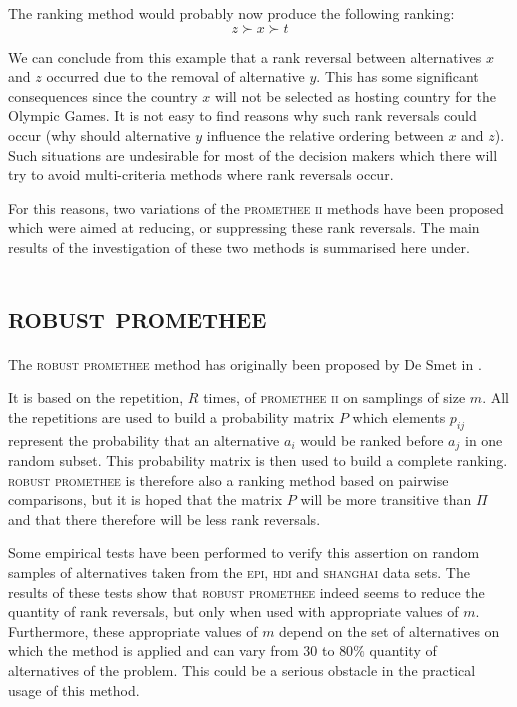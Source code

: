 \documentclass[conference,compsoc]{IEEEtran}
\begin{document}
The ranking method would probably now produce the following ranking:
\begin{equation}
  z \succ x \succ t
  \label{eq:ranking_3alt_t}
\end{equation}

We can conclude from this example that a rank reversal between alternatives $x$ and $z$ occurred due to the removal of alternative $y$. This has some significant consequences since the country $x$ will not be selected as hosting country for the Olympic Games. It is not easy to find reasons why such rank reversals could occur (why should alternative $y$ influence the relative ordering between $x$ and $z$). Such situations are undesirable for most of the decision makers which there will try to avoid multi-criteria methods where rank reversals occur.

For this reasons, two variations of the \textsc{promethee ii} methods have been proposed which were aimed at reducing, or suppressing these rank reversals. The main results of the investigation of these two methods is summarised here under.

\section{\textsc{robust promethee}}


The \textsc{robust promethee} method has originally been proposed by De Smet in \cite{RobPII}. 

It is based on the repetition, $R$ times, of \textsc{promethee ii} on samplings of size $m$. All the repetitions are used to build a probability matrix $P$ which elements $p_{ij}$ represent the probability that an alternative $a_i$ would be ranked before $a_j$ in one random subset. This probability matrix is then used to build a complete ranking. \textsc{robust promethee} is therefore also a ranking method based on pairwise comparisons, but it is hoped that the matrix $P$ will be more transitive than $\Pi$ and that there therefore will be less rank reversals.

Some empirical tests have been performed to verify this assertion on random samples of alternatives taken from the \textsc{epi}\cite{EPI}, \textsc{hdi}\cite{HDI} and \textsc{shanghai}\cite{SHA} data sets.
The results of these tests show that \textsc{robust promethee} indeed seems to reduce the quantity of rank reversals, but only when used with appropriate values of $m$. Furthermore, these appropriate values of $m$ depend on the set of alternatives on which the method is applied and can vary from $30$ to $80 \%$ quantity of alternatives of the problem. This could be a serious obstacle in the practical usage of this method.
\end{document}
